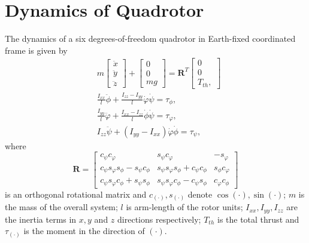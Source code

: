\documentclass[AMA,STIX1COL,sort, compress]{WileyNJD-v2}
\begin{document}
\section{Dynamics of Quadrotor}
The dynamics of a six degrees-of-freedom quadrotor in Earth-fixed coordinated frame is given by \cite{tang2015mixed, nicol2011robust}
\begin{subequations}\label{quad_dyn}
	\begin{align}
	&m \begin{bmatrix}
	\ddot{x}\\ 
	\ddot{y}\\ 
	\ddot{z}
	\end{bmatrix} + \begin{bmatrix}
	0\\ 
	0\\ 
	mg
	\end{bmatrix} = \mathbf{R}^T \begin{bmatrix}
	0\\ 
	0\\
	T_{th},
	\end{bmatrix} \label{pos_dyn}\\
	&\frac{I_{xx}}{l}\ddot{\phi} + \frac{I_{zz}-I_{yy}}{l}\dot{\varphi}\dot{\psi} = \tau_\phi,\nonumber\\
	&\frac{I_{yy}}{l}\ddot{\varphi} + \frac{I_{xx}-I_{zz}}{l}\dot{\phi}\dot{\psi}= \tau_\varphi, \nonumber\\
	& I_{zz}\ddot{\psi} + (I_{yy}-I_{xx})\dot{\varphi}\dot{\phi}= \tau_\psi, \label{att_sub}
	\end{align}
\end{subequations}
where $$\mathbf{R} =\begin{bmatrix}
c_\psi c_\varphi & s_\psi c_\varphi & -s_\varphi \\
c_\psi s_\varphi s_\phi  - s_\psi c_\phi & s_\psi s_\varphi s_\phi  + c_\psi c_\phi & s_\phi  c_\varphi\\
c_\psi s_\varphi c_\phi + s_\psi s_\phi  &  s_\psi s_\varphi c_\phi - c_\psi s_\phi  & c_\varphi c_\phi
\end{bmatrix}$$
is an orthogonal rotational matrix and $c_{(\cdot)},s_{(\cdot)}$ denote $\cos{(\cdot)},\sin{(\cdot)}$; $m$ is the mass of the overall system; $l$ is arm-length of the rotor units; $I_{xx}, I_{yy},I_{zz}  $ are the inertia terms in $x,y$ and $z$ directions respectively; $T_{th}$ is the total thrust and $\tau_{(\cdot)}$ is the moment in the direction of $(\cdot)$.
\end{document}
